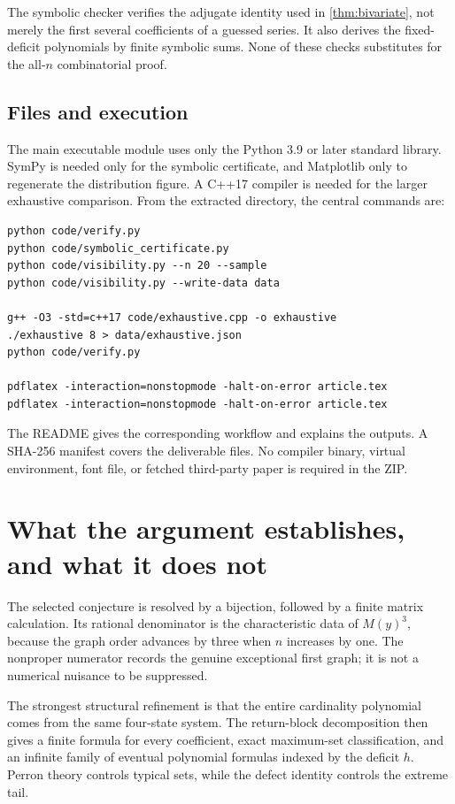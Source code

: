 \documentclass[11pt,a4paper]{article}
\theoremstyle{definition}
\begin{document}
The symbolic checker verifies the adjugate identity used in
\cref{thm:bivariate}, not merely the first several coefficients of a guessed
series. It also derives the fixed-deficit polynomials by finite symbolic
sums. None of these checks substitutes for the all-$n$ combinatorial proof.

\subsection{Files and execution}

The main executable module uses only the Python 3.9 or later standard
library. SymPy is needed only for the symbolic certificate, and Matplotlib
only to regenerate the distribution figure. A C++17 compiler is needed for
the larger exhaustive comparison. From the extracted directory, the central
commands are:
\begin{verbatim}
python code/verify.py
python code/symbolic_certificate.py
python code/visibility.py --n 20 --sample
python code/visibility.py --write-data data

g++ -O3 -std=c++17 code/exhaustive.cpp -o exhaustive
./exhaustive 8 > data/exhaustive.json
python code/verify.py

pdflatex -interaction=nonstopmode -halt-on-error article.tex
pdflatex -interaction=nonstopmode -halt-on-error article.tex
\end{verbatim}

The README gives the corresponding workflow and explains the outputs.
A SHA-256 manifest covers the deliverable files. No compiler binary, virtual
environment, font file, or fetched third-party paper is required in the ZIP.

\section{What the argument establishes, and what it does not}
\label{sec:scope}

The selected conjecture is resolved by a bijection, followed by a finite
matrix calculation. Its rational denominator is the characteristic data of
$M(y)^3$, because the graph order advances by three when $n$ increases by
one. The nonproper numerator records the genuine exceptional first graph;
it is not a numerical nuisance to be suppressed.

The strongest structural refinement is that the entire cardinality
polynomial comes from the same four-state system. The return-block
decomposition then gives a finite formula for every coefficient, exact
maximum-set classification, and an infinite family of eventual polynomial
formulas indexed by the deficit $h$. Perron theory controls typical sets,
while the defect identity controls the extreme tail.
\end{document}
